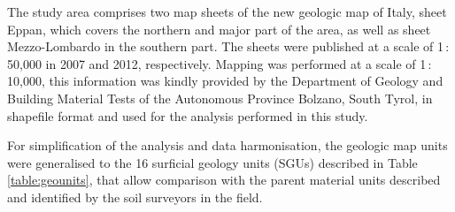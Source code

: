 \documentclass[preprint,12pt,authoryear]{elsarticle}
\begin{document}
The study area comprises two map sheets of the new geologic map of Italy, sheet Eppan,  which covers the northern and major part of the area, as well as sheet Mezzo-Lombardo in the southern part. The sheets were published at a scale of 1\,:\,50,000 in 2007 and 2012, respectively. Mapping was performed at a scale of 1\,:\,10,000, this information was kindly provided by the Department of Geology and Building Material Tests of the Autonomous Province Bolzano, South Tyrol, in shapefile format and used for the analysis performed in this study.
 
For simplification of the analysis and data harmonisation, the geologic map units were generalised to the 16 surficial geology units (SGUs) described in Table \ref{table:geounits}, that allow comparison with the parent material units described and identified by the soil surveyors in the field.
\end{document}
